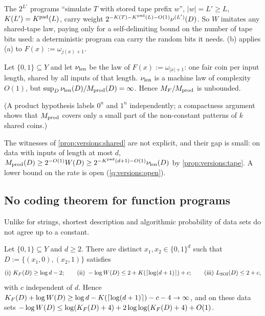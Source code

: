 The $2^{L'}$ programs ``simulate $T$ with stored tape prefix $w$'', $|w|=L'\ge L$, $K(L')=K^{\mathrm{pad}}(L)$, carry weight $2^{-K(T)-K^{\mathrm{pad}}(L)-O(1)}\nu^{(L')}(D)$. So $W$ imitates any shared-tape law, paying only for a self-delimiting bound on the number of tape bits used: a deterministic program can carry the random bits it needs. (b) applies (a) to $F(x):=\omega_{j(x)+1}$.

\begin{proposition}\label{prop:versions:shared}
Let $\{0,1\}\subseteq Y$ and let $\nu_{\mathrm{len}}$ be the law of $F(x):=\omega_{|x|+1}$: one fair coin per input length, shared by all inputs of that length. $\nu_{\mathrm{len}}$ is a machine law of complexity $O(1)$, but $\sup_D\nu_{\mathrm{len}}(D)/M_{\mathrm{prod}}(D)=\infty$. Hence $M_{F}/M_{\mathrm{prod}}$ is unbounded.
\end{proposition}

(A product hypothesis labels $0^n$ and $1^n$ independently; a compactness argument shows that $M_{\mathrm{prod}}$ covers only a small part of the non-constant patterns of $k$ shared coins.)

\begin{remark}\label{rem:versions:sharedsize}
The witnesses of \cref{prop:versions:shared} are not explicit, and their gap is small: on data with inputs of length at most $d$, $M_{\mathrm{prod}}(D)\ge2^{-O(1)}W(D)\ge2^{-K^{\mathrm{pad}}(d+1)-O(1)}\nu_{\mathrm{len}}(D)$ by \cref{prop:versions:tape}. A lower bound on the rate is open (\cref{q:versions:open}).
\end{remark}

\subsection{No coding theorem for function programs}\label{sec:versions:coding}

Unlike for strings, shortest description and algorithmic probability of data sets do not agree up to a constant.

\begin{theorem}\label{thm:versions:nocoding}
Let $\{0,1\}\subseteq Y$ and $d\ge2$. There are distinct $x_1,x_2\in\{0,1\}^d$ such that $D:=\{(x_1,0),(x_2,1)\}$ satisfies
\[
\text{(i) }K_{F}(D)\ge\log d-2;\qquad\text{(ii) }-\log W(D)\le2+K(\lceil\log(d+1)\rceil)+c;\qquad\text{(iii) }L_{\mathrm{SOI}}(D)\le2+c,
\]
with $c$ independent of $d$. Hence $K_{F}(D)+\log W(D)\ge\log d-K(\lceil\log(d+1)\rceil)-c-4\to\infty$, and on these data sets $-\log W(D)\le\log(K_{F}(D)+4)+2\log\log(K_{F}(D)+4)+O(1)$.
\end{theorem}

